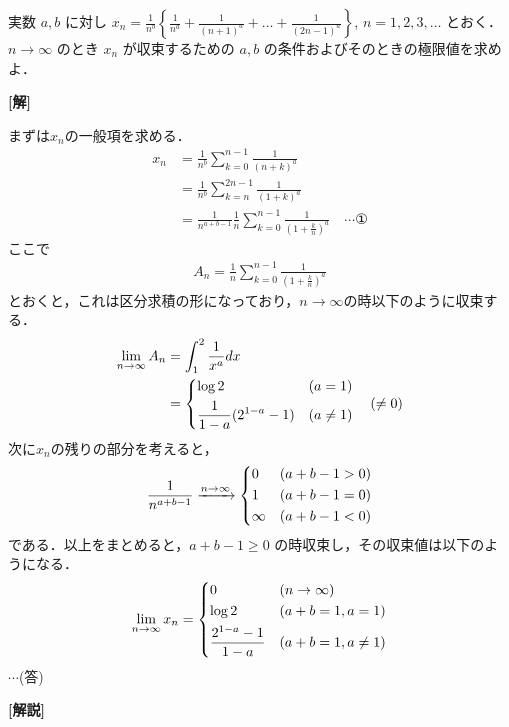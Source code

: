 \documentclass[a4paper,10pt]{ltjsarticle}
\begin{document}
\begin{oframed}
実数 $a, b$ に対し $\displaystyle x_n = \frac{1}{n^b} \left\{ \frac{1}{n^a} + \frac{1}{(n+1)^a} + \dots + \frac{1}{(2n-1)^a} \right\}$, $n=1,2,3,\dots$ とおく．$n \to \infty$ のとき $x_n$ が収束するための $a, b$ の条件およびそのときの極限値を求めよ．
\end{oframed}
\setlength{\columnseprule}{0.4pt}
\begin{multicols}{2}
{\bf[解]}

まずは$x_n$の一般項を求める．
\begin{align*}
x_n 
&= \frac{1}{n^{b}} \sum_{k=0}^{n-1} \frac{1}{(n+k)^a} \\
&= \frac{1}{n^{b}} \sum_{k=n}^{2n-1} \frac{1}{\left(1+k\right)^a} \\
&= \frac{1}{n^{a+b-1}} \frac{1}{n}\sum_{k=0}^{n-1} \frac{1}{\left(1+\frac{k}{n}\right)^a} \quad \cdots \text{①}
\end{align*}
ここで
\begin{align*}
    A_n = \frac{1}{n}\sum_{k=0}^{n-1} \frac{1}{\left(1+\frac{k}{n}\right)^a}
\end{align*}
とおくと，これは区分求積の形になっており，$n\to\infty$の時以下のように収束する．
\begin{align*}
 \lim_{n\to\infty} A_n 
 &= \int_1^2 \frac{1}{x^a} dx \\
 &= 
  \begin{dcases} 
    \log 2 & (a=1) \\ 
    \frac{1}{1-a}(2^{1-a}-1) & (a \ne 1) 
  \end{dcases} \quad (\ne 0)
\end{align*}
次に$x_n$の残りの部分を考えると，
\begin{align*}
    \frac{1}{n^{a+b-1}} \xrightarrow{n \to \infty} 
    \begin{dcases} 
        0 & (a+b-1 > 0) \\ 
        1 & (a+b-1 = 0) \\ 
        \infty & (a+b-1 < 0) 
    \end{dcases} 
\end{align*}
である．以上をまとめると，$a+b-1 \ge 0$ の時収束し，その収束値は以下のようになる．
\begin{align*}
 \lim_{n\to\infty} x_n = 
 \begin{dcases}
    0  & (n \to \infty) \\
    \log 2 & (a+b=1, a=1) \\
    \frac{2^{1-a}-1}{1-a} & (a+b=1, a \ne 1)
 \end{dcases}
\end{align*}
$\cdots$(答)

{\bf[解説]}

     \newpage
\end{multicols}
\end{document}
